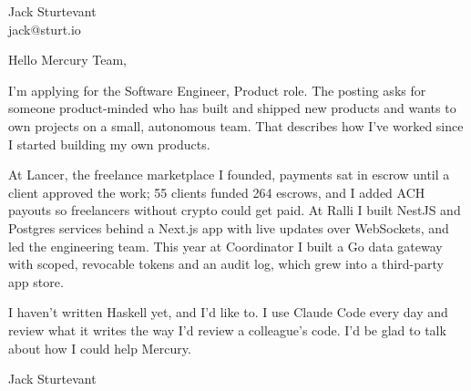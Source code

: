 \documentclass[11pt]{article}
\begin{document}
\raggedright

{\namefont\fontsize{20pt}{24pt}\selectfont Jack Sturtevant}\\[-0.3em]
jack@sturt.io

\vspace{1.2em}

Hello Mercury Team,

I'm applying for the Software Engineer, Product role. The posting asks for someone product-minded who has built and shipped new products and wants to own projects on a small, autonomous team. That describes how I've worked since I started building my own products.

At Lancer, the freelance marketplace I founded, payments sat in escrow until a client approved the work; 55 clients funded 264 escrows, and I added ACH payouts so freelancers without crypto could get paid. At Ralli I built NestJS and Postgres services behind a Next.js app with live updates over WebSockets, and led the engineering team. This year at Coordinator I built a Go data gateway with scoped, revocable tokens and an audit log, which grew into a third-party app store.

I haven't written Haskell yet, and I'd like to. I use Claude Code every day and review what it writes the way I'd review a colleague's code. I'd be glad to talk about how I could help Mercury.

\vspace{0.6em}
Jack Sturtevant
\end{document}
